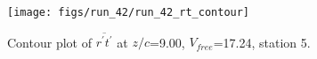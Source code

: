 \begin{figure}[H]
\centering
\texttt{[image: figs/run\_42/run\_42\_rt\_contour]}
\caption{Contour plot of $\overline{r^\prime t^\prime}$ at $z/c$=9.00, $V_{free}$=17.24, station 5.}
\label{fig:run_42_rt_contour}
\end{figure}


